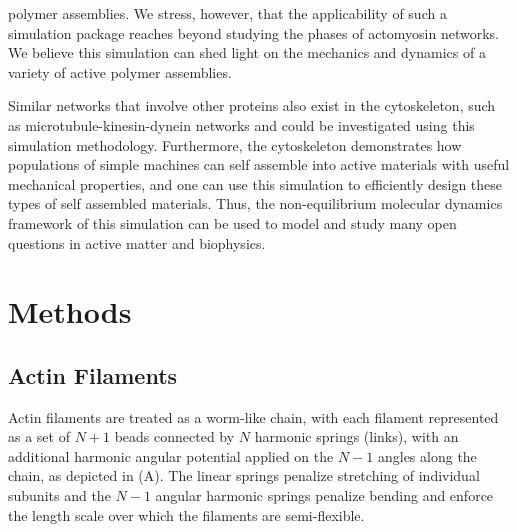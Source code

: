 \documentclass[12pt]{article}
\begin{document}
polymer assemblies. We stress, however, that the applicability of such a
simulation package reaches beyond studying the phases of actomyosin networks.  
We believe this simulation can shed light on the mechanics and dynamics of 
a variety of active polymer assemblies.
\par
Similar networks that involve other proteins also exist in the
cytoskeleton, such as microtubule-kinesin-dynein networks and could be
investigated using this simulation methodology. Furthermore, the cytoskeleton
demonstrates how populations of simple machines can self assemble into active
materials with useful mechanical properties, and one can use this simulation to
efficiently design these types of self assembled materials. Thus, the
non-equilibrium molecular dynamics framework of this simulation can be used to
model and study many open questions in active matter and biophysics.
\section{Methods}  
\subsection{Actin Filaments}
Actin filaments are treated as a worm-like chain, with each filament represented as a set of $N+1$ beads connected by $N$ harmonic springs (links), with an additional harmonic angular potential applied on the $N-1$ angles along the chain, as depicted in (A). The linear springs 
penalize stretching of individual subunits and the $N-1$ angular harmonic springs penalize bending and enforce the length scale over which the filaments are semi-flexible. 
\end{document}
